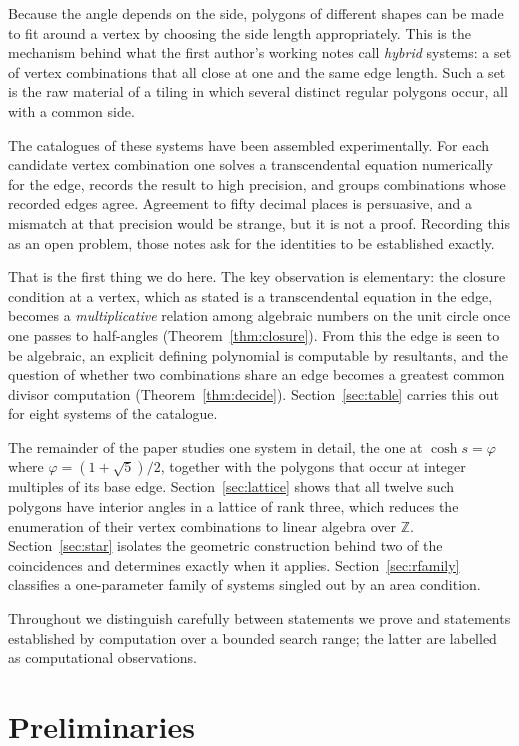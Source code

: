 \documentclass[11pt,a4paper]{article}
\theoremstyle{plain}
\theoremstyle{definition}
\theoremstyle{remark}
\newcommand{\ZZ}{\mathbb{Z}}
\begin{document}
Because the angle depends on the side, polygons of different shapes can be made to
fit around a vertex by choosing the side length appropriately. This is the
mechanism behind what the first author's working notes call \emph{hybrid}
systems: a set of vertex combinations that all close at one and the same edge
length. Such a set is the raw material of a tiling in which several distinct
regular polygons occur, all with a common side.

The catalogues of these systems have been assembled experimentally. For each
candidate vertex combination one solves a transcendental equation numerically for
the edge, records the result to high precision, and groups combinations whose
recorded edges agree. Agreement to fifty decimal places is persuasive, and a
mismatch at that precision would be strange, but it is not a proof. Recording
this as an open problem, those notes ask for the identities to be established
exactly.

That is the first thing we do here. The key observation is elementary: the
closure condition at a vertex, which as stated is a transcendental equation in
the edge, becomes a \emph{multiplicative} relation among algebraic numbers on the
unit circle once one passes to half-angles (Theorem~\ref{thm:closure}). From this
the edge is seen to be algebraic, an explicit defining polynomial is computable by
resultants, and the question of whether two combinations share an edge becomes a
greatest common divisor computation (Theorem~\ref{thm:decide}). Section~\ref{sec:table}
carries this out for eight systems of the catalogue.

The remainder of the paper studies one system in detail, the one at
$\cosh s=\varphi$ where $\varphi=(1+\sqrt5)/2$, together with the polygons that
occur at integer multiples of its base edge. Section~\ref{sec:lattice} shows that
all twelve such polygons have interior angles in a lattice of rank three, which
reduces the enumeration of their vertex combinations to linear algebra over
$\ZZ$. Section~\ref{sec:star} isolates the geometric construction behind two of
the coincidences and determines exactly when it applies.
Section~\ref{sec:rfamily} classifies a one-parameter family of systems singled
out by an area condition.

Throughout we distinguish carefully between statements we prove and statements
established by computation over a bounded search range; the latter are labelled
as computational observations.

\section{Preliminaries}
\end{document}
